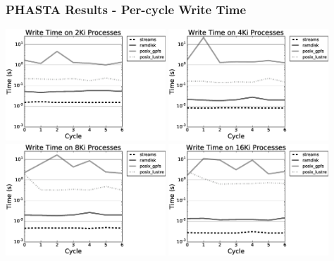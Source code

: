 \documentclass{beamer}
\begin{document}
\begin{frame}
  \frametitle{PHASTA Results - Per-cycle Write Time}
  \centering
  \includegraphics[width=0.45\textwidth]{../imp/results/phasta-dambreak/theta/chef2048write.eps}
  \includegraphics[width=0.45\textwidth]{../imp/results/phasta-dambreak/theta/chef4096write.eps}\\
  \includegraphics[width=0.45\textwidth]{../imp/results/phasta-dambreak/theta/chef8192write.eps}
  \includegraphics[width=0.45\textwidth]{../imp/results/phasta-dambreak/theta/chef16384write.eps}\\
\end{frame}

\end{document}
